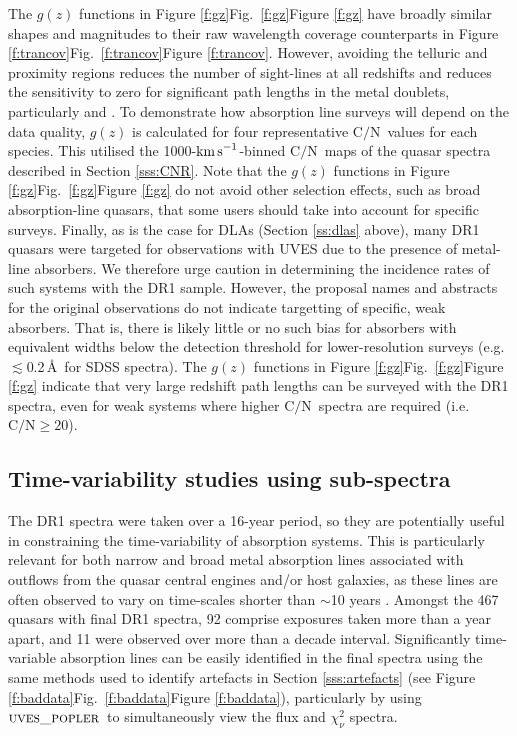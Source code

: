 \documentclass[fleqn,usenatbib,usedcolumn]{mnras}
\renewcommand{\la}{\lesssim} %
\newcommand{\Sref}[1]{Section \ref{#1}}
\newcommand{\Fref}[1]{\ifhmode \ifnum\spacefactor=1001 Figure \ref{#1}\else Fig.\ \ref{#1}\fi \else Figure \ref{#1}\fi}
\newcommand{\kms}{\ensuremath{\textrm{km\,s}^{-1}}}
\newcommand{\CN}{\ensuremath{\textrm{C/N}}}
\newcommand{\popler}{\ensuremath{\textsc{uves\_popler}}}
\begin{document}
The $g(z)$ functions in \Fref{f:gz} have broadly similar shapes and magnitudes to their raw wavelength coverage counterparts in \Fref{f:trancov}. However, avoiding the telluric and proximity regions reduces the number of sight-lines at all redshifts and reduces the sensitivity to zero for significant path lengths in the metal doublets, particularly  and . To demonstrate how absorption line surveys will depend on the data quality, $g(z)$ is calculated for four representative \CN\ values for each species. This utilised the 1000-\kms-binned \CN\ maps of the quasar spectra described in \Sref{sss:CNR}. Note that the $g(z)$ functions in \Fref{f:gz} do not avoid other selection effects, such as broad absorption-line quasars, that some users should take into account for specific surveys. Finally, as is the case for DLAs (\Sref{ss:dlas} above), many DR1 quasars were targeted for observations with UVES due to the presence of metal-line absorbers. We therefore urge caution in determining the incidence rates of such systems with the DR1 sample. However, the proposal names and abstracts for the original observations do not indicate targetting of specific, weak absorbers. That is, there is likely little or no such bias for absorbers with equivalent widths below the detection threshold for lower-resolution surveys (e.g.\ $\la$0.2\,\AA\ for SDSS spectra). The $g(z)$ functions in \Fref{f:gz} indicate that very large redshift path lengths can be surveyed with the DR1 spectra, even for weak systems where higher \CN\ spectra are required (i.e.\ $\CN\ge20$).



\subsection{Time-variability studies using sub-spectra}

The DR1 spectra were taken over a 16-year period, so they are potentially useful in constraining the time-variability of absorption systems. This is particularly relevant for both narrow and broad metal absorption lines associated with outflows from the quasar central engines and/or host galaxies, as these lines are often observed to vary on time-scales shorter than $\sim$10 years \citep[e.g][]{Hamann:2011:1957,RodriguezHidalgo:2013:14}. Amongst the 467 quasars with final DR1 spectra, 92 comprise exposures taken more than a year apart, and 11 were observed over more than a decade interval. Significantly time-variable absorption lines can be easily identified in the final spectra using the same methods used to identify artefacts in \Sref{sss:artefacts} (see \Fref{f:baddata}), particularly by using \popler\ to simultaneously view the flux and $\chi^2_\nu$ spectra.
\end{document}
